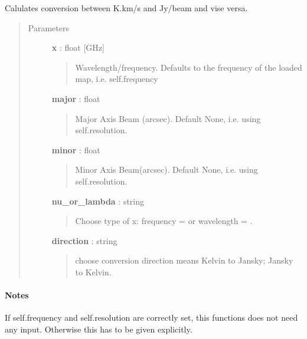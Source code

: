 \documentclass[a4paper,10pt,english]{sphinxmanual}
\begin{document}
\begin{fulllineitems}

\begin{fulllineitems}
\label{maps:astrolyze.maps.main.Map.flux_conversion}
Calulates conversion between K.km/s and Jy/beam and vise versa.
\begin{quote}\begin{description}
\item[{Parameters }] \leavevmode
\textbf{x} : float {[}GHz{]}
\begin{quote}

Wavelength/frequency. Defaults to the frequency of the loaded map,
i.e. self.frequency
\end{quote}

\textbf{major} : float
\begin{quote}

Major Axis Beam (arcsec). Default None, i.e. using self.resolution.
\end{quote}

\textbf{minor} : float
\begin{quote}

Minor Axis Beam(arcsec). Default None, i.e. using self.resolution.
\end{quote}

\textbf{nu\_or\_lambda} : string
\begin{quote}

Choose type of x: frequency =  or wavelength =
.
\end{quote}

\textbf{direction} : string
\begin{quote}

choose conversion direction 
means Kelvin to Jansky;  Jansky to Kelvin.
\end{quote}

\end{description}\end{quote}
\paragraph{Notes}

If self.frequency and self.resolution are correctly set, this functions
does not need any input. Otherwise this has to be given explicitly.

\end{fulllineitems}


\end{fulllineitems}
\end{document}
